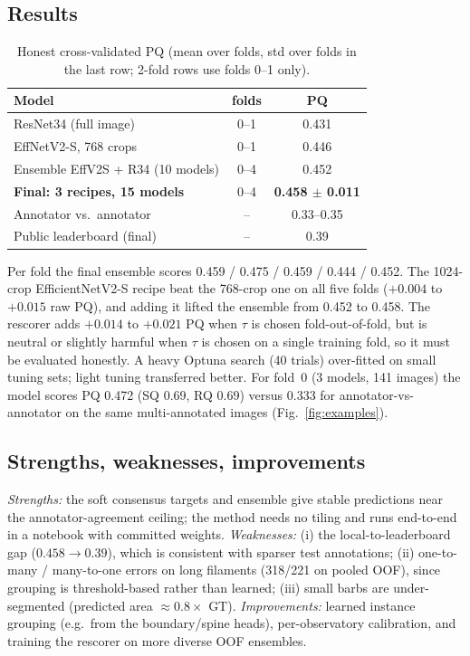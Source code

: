 \documentclass[sigconf]{acmart}
\begin{document}
\subsection{Results}
\begin{table}[h]
\caption{Honest cross-validated PQ (mean over folds, std over folds in the last row; 2-fold rows use folds 0--1 only).}\label{tab:res}
\small
\begin{tabular}{lcc}
\toprule
Model & folds & PQ \\
\midrule
ResNet34 (full image) & 0--1 & 0.431 \\
EffNetV2-S, 768 crops & 0--1 & 0.446 \\
Ensemble EffV2S + R34 (10 models) & 0--4 & 0.452 \\
\textbf{Final: 3 recipes, 15 models} & 0--4 & \textbf{0.458 $\pm$ 0.011} \\
\midrule
Annotator vs.\ annotator & -- & 0.33--0.35 \\
Public leaderboard (final) & -- & 0.39 \\
\bottomrule
\end{tabular}
\end{table}
Per fold the final ensemble scores 0.459 / 0.475 / 0.459 / 0.444 / 0.452. The 1024-crop EfficientNetV2-S recipe beat the 768-crop one on all five folds ($+0.004$ to $+0.015$ raw PQ), and adding it lifted the ensemble from 0.452 to 0.458. The rescorer adds $+0.014$ to $+0.021$ PQ when $\tau$ is chosen fold-out-of-fold, but is neutral or slightly harmful when $\tau$ is chosen on a single training fold, so it must be evaluated honestly. A heavy Optuna search (40 trials) over-fitted on small tuning sets; light tuning transferred better. For fold~0 (3 models, 141 images) the model scores PQ 0.472 (SQ 0.69, RQ 0.69) versus 0.333 for annotator-vs-annotator on the same multi-annotated images (Fig.~\ref{fig:examples}).

\subsection{Strengths, weaknesses, improvements}
\emph{Strengths:} the soft consensus targets and ensemble give stable predictions near the annotator-agreement ceiling; the method needs no tiling and runs end-to-end in a notebook with committed weights. \emph{Weaknesses:} (i) the local-to-leaderboard gap ($0.458\to0.39$), which is consistent with sparser test annotations; (ii) one-to-many / many-to-one errors on long filaments (318/221 on pooled OOF), since grouping is threshold-based rather than learned; (iii) small barbs are under-segmented (predicted area $\approx0.8\times$ GT). \emph{Improvements:} learned instance grouping (e.g.\ from the boundary/spine heads), per-observatory calibration, and training the rescorer on more diverse OOF ensembles.
\end{document}
